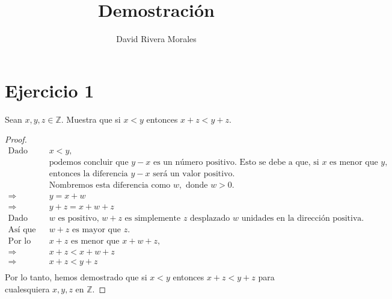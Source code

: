 \documentclass{article}
\begin{document}
\title{Demostración}
\author{David Rivera Morales}
\maketitle

\section*{Ejercicio 1}

Sean \(x, y, z \in \mathbb{Z}\). Muestra que si \(x < y\) entonces \(x + z < y + z\).

\begin{proof}
\begin{align*}
\text{Dado que } & x < y, \\
& \text{podemos concluir que } y - x \text{ es un número positivo. Esto se debe a que, si } x \text{ es menor que } y, \\
& \text{entonces la diferencia } y - x \text{ será un valor positivo.} \\
& \text{Nombremos esta diferencia como } w, \text{ donde } w > 0. \\
\Rightarrow & y = x + w \\
\Rightarrow & y + z = x + w + z \\
\text{Dado que } & w \text{ es positivo, } w + z \text{ es simplemente } z \text{ desplazado } w \text{ unidades en la dirección positiva.} \\
\text{Así que } & w + z \text{ es mayor que } z. \\
\text{Por lo tanto, } & x + z \text{ es menor que } x + w + z, \\
\Rightarrow & x + z < x + w + z \\
\Rightarrow & x + z < y + z \\
\end{align*}
Por lo tanto, hemos demostrado que si \(x < y\) entonces \(x + z < y + z\) para cualesquiera \(x, y, z\) en \(\mathbb{Z}\).
\end{proof}
\end{document}
